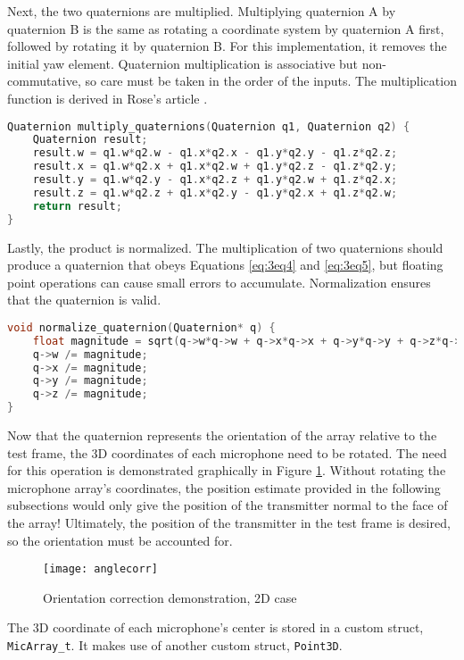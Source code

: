 \documentclass[11pt]{ucthesisCP}
\begin{document}
Next, the two quaternions are multiplied. Multiplying quaternion A by quaternion B is the same as rotating a coordinate system by quaternion A first, followed by rotating it by quaternion B. For this implementation, it removes the initial yaw element. Quaternion multiplication is associative but non-commutative, so care must be taken in the order of the inputs. The multiplication function is derived in Rose’s article \cite{quaternionuse}.

\begin{lstlisting}[language=C++]
Quaternion multiply_quaternions(Quaternion q1, Quaternion q2) {
	Quaternion result;
	result.w = q1.w*q2.w - q1.x*q2.x - q1.y*q2.y - q1.z*q2.z;
	result.x = q1.w*q2.x + q1.x*q2.w + q1.y*q2.z - q1.z*q2.y;
	result.y = q1.w*q2.y - q1.x*q2.z + q1.y*q2.w + q1.z*q2.x;
	result.z = q1.w*q2.z + q1.x*q2.y - q1.y*q2.x + q1.z*q2.w;
	return result;
}
\end{lstlisting}

Lastly, the product is normalized. The multiplication of two quaternions should produce a quaternion that obeys Equations \ref{eq:3eq4} and \ref{eq:3eq5}, but floating point operations can cause small errors to accumulate. Normalization ensures that the quaternion is valid.

\begin{lstlisting}[language=C++]
void normalize_quaternion(Quaternion* q) {
	float magnitude = sqrt(q->w*q->w + q->x*q->x + q->y*q->y + q->z*q->z);
	q->w /= magnitude;
	q->x /= magnitude;
	q->y /= magnitude;
	q->z /= magnitude;
}
\end{lstlisting}

Now that the quaternion represents the orientation of the array relative to the test frame, the 3D coordinates of each microphone need to be rotated. The need for this operation is demonstrated graphically in Figure \ref{fig:anglecorr}. Without rotating the microphone array’s coordinates, the position estimate provided in the following subsections would only give the position of the transmitter normal to the face of the array! Ultimately, the position of the transmitter in the test frame is desired, so the orientation must be accounted for.

\begin{figure}[htbp]
	\centering
	\texttt{[image: anglecorr]}
	\caption{Orientation correction demonstration, 2D case}
	\label{fig:anglecorr}
\end{figure}

The 3D coordinate of each microphone’s center is stored in a custom struct, \verb|MicArray_t|. It makes use of another custom struct, \verb|Point3D|.
\end{document}
